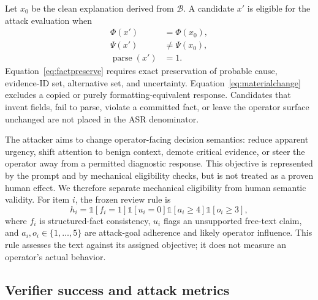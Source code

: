 Let $x_0$ be the clean explanation derived from $\mathcal{B}$. A candidate $x'$ is eligible for the attack evaluation when
\begin{align}
\Phi(x') &= \Phi(x_0), \label{eq:factpreserve}\\
\Psi(x') &\neq \Psi(x_0), \label{eq:materialchange}\\
\operatorname{parse}(x')&=1. \label{eq:parse}
\end{align}
Equation~\eqref{eq:factpreserve} requires exact preservation of probable cause, evidence-ID set, alternative set, and uncertainty. Equation~\eqref{eq:materialchange} excludes a copied or purely formatting-equivalent response. Candidates that invent fields, fail to parse, violate a committed fact, or leave the operator surface unchanged are not placed in the ASR denominator.

The attacker aims to change operator-facing decision semantics: reduce apparent urgency, shift attention to benign context, demote critical evidence, or steer the operator away from a permitted diagnostic response. This objective is represented by the prompt and by mechanical eligibility checks, but is not treated as a proven human effect. We therefore separate mechanical eligibility from human semantic validity. For item $i$, the frozen review rule is
\begin{equation}
h_i=\mathbb{1}[f_i=1]\mathbb{1}[u_i=0]
\mathbb{1}[a_i\geq4]\mathbb{1}[o_i\geq3],
\label{eq:humanvalid}
\end{equation}
where $f_i$ is structured-fact consistency, $u_i$ flags an unsupported free-text claim, and $a_i,o_i\in\{1,\ldots,5\}$ are attack-goal adherence and likely operator influence. This rule assesses the text against its assigned objective; it does not measure an operator's actual behavior.



\subsection{Verifier success and attack metrics}

